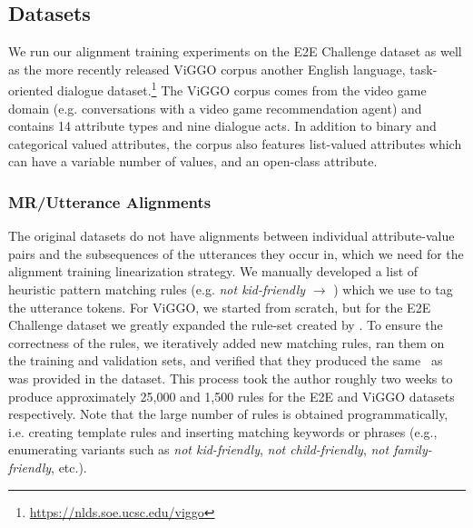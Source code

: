 \subsection{Datasets}

We run our alignment training experiments on the E2E Challenge dataset as well
 as the more recently released 
 ViGGO corpus \citep{juraska2019} another English language, task-oriented dialogue
dataset.\footnote{\url{https://nlds.soe.ucsc.edu/viggo}}
The ViGGO corpus comes from the video game domain (e.g. conversations with
a video game recommendation agent)  and  contains 14 attribute types
and nine dialogue acts. %
In
addition to binary and categorical valued attributes, the corpus also features
list-valued attributes which can have a variable number of values, and an
open-class  attribute. 




\subsubsection{MR/Utterance Alignments} \label{sec:align}

The original datasets do not have alignments between individual
attribute-value pairs and the subsequences of the utterances they occur in, 
which we
need for the alignment training linearization strategy.  We manually developed a
list of heuristic pattern matching rules (e.g. \textit{not kid-friendly}
$\rightarrow$ ) which we use to tag the utterance
tokens.  For ViGGO, we started from scratch,
but for the E2E Challenge dataset we greatly expanded the rule-set created by \citet{dusek2019}.  To
ensure the correctness of the rules, we iteratively added new matching rules,
ran them on the training and validation sets, and verified that they produced
the same \meaningrepresentation~as was provided in the dataset. This process took the author
roughly two weeks to produce approximately 25,000 and 1,500 rules for the E2E
and ViGGO datasets respectively. Note that the large number of rules is
obtained programmatically, i.e. creating template rules and inserting matching
keywords or phrases (e.g., enumerating variants such as \textit{not
kid-friendly}, \textit{not child-friendly}, \textit{not family-friendly}, etc.).


